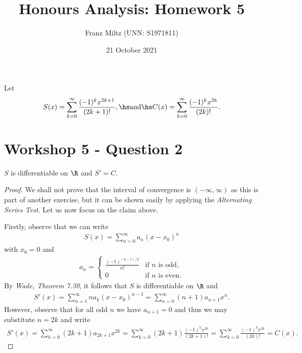 \documentclass{article}
\begin{document}
\title{Honours Analysis: Homework 5}
\author{Franz Miltz (UNN: S1971811)}
\date{21 October 2021}
\maketitle

Let
\begin{align*}
   S(x) =\sum_{k=0}^\infty \frac{(-1)^k x^{2k+1}}{(2k+1)!},\hs \text{and}\hs
   C(x) = \sum_{k=0}^\infty \frac{(-1)^k x^{2k}}{(2k)!}.
\end{align*}

\section*{Workshop 5 - Question 2}

\begin{claim*}
   $S$ is differentiable on $\R$ and $S'=C$.
\end{claim*}

\begin{proof}
   We shall not prove that the interval of convergence is $(-\infty,\infty)$
   as this is part of another exercise, but it can be shown easily by
   applying the \emph{Alternating Series Test}. Let us now focus on the claim above.

   Firstly, observe that we can write
   \begin{align*}
      S(x) = \sum_{n=0}^\infty a_n(x-x_0)^n
   \end{align*}
   with $x_0 = 0$ and
   \begin{align*}
      a_n = \begin{cases}
         \frac{(-1)^{(n-1)/2}}{n!} & \text{if $n$ is odd},  \\
         0                         & \text{if $n$ is even}.
      \end{cases}
   \end{align*}
   By \emph{Wade, Theorem 7.30}, it follows that $S$ is differentiable on $\R$
   and
   \begin{align*}
      S'(x) = \sum_{n=1}^\infty na_k(x-x_0)^{n-1}
      = \sum_{n=0}^\infty (n+1)a_{n+1}x^n.
   \end{align*}
   However, observe that for all odd $n$ we have $a_{n+1}=0$
   and thus we may substitute $n=2k$ and write
   \begin{align*}
      S'(x) = \sum_{k=0}^\infty (2k+1)a_{2k+1}x^{2k}
      = \sum_{k=0}^\infty (2k+1)\frac{(-1)^k x^{2k}}{(2k+1)!}
      = \sum_{k=0}^\infty \frac{(-1)^k x^{2k}}{(2k)!} = C(x).
   \end{align*}
\end{proof}
\end{document}
